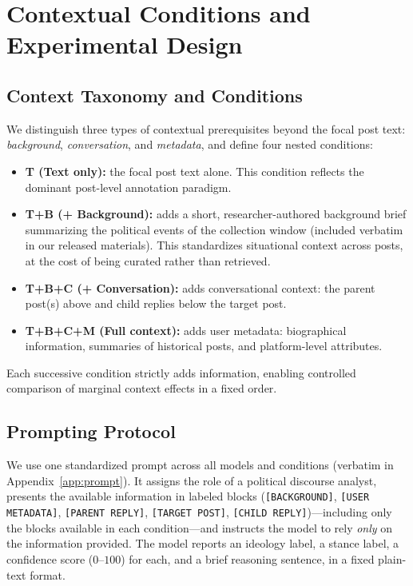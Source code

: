 \documentclass[11pt]{article}
\begin{document}
\section{Contextual Conditions and Experimental Design}
\label{sec:context_design}

\subsection{Context Taxonomy and Conditions}
\label{sec:context_conditions}

We distinguish three types of contextual prerequisites beyond the focal post text: \textit{background}, \textit{conversation}, and \textit{metadata}, and define four nested conditions:

\begin{itemize}
    \item \textbf{T (Text only):} the focal post text alone. This condition reflects the dominant post-level annotation paradigm.
    \item \textbf{T+B (+ Background):} adds a short, researcher-authored background brief summarizing the political events of the collection window (included verbatim in our released materials). This standardizes situational context across posts, at the cost of being curated rather than retrieved.
    \item \textbf{T+B+C (+ Conversation):} adds conversational context: the parent post(s) above and child replies below the target post.
    \item \textbf{T+B+C+M (Full context):} adds user metadata: biographical information, summaries of historical posts, and platform-level attributes.
\end{itemize}

Each successive condition strictly adds information, enabling controlled comparison of marginal context effects in a fixed order.

\subsection{Prompting Protocol}
\label{sec:prompting}
We use one standardized prompt across all models and conditions (verbatim in Appendix~\ref{app:prompt}). It assigns the role of a political discourse analyst, presents the available information in labeled blocks (\texttt{[BACKGROUND]}, \texttt{[USER METADATA]}, \texttt{[PARENT REPLY]}, \texttt{[TARGET POST]}, \texttt{[CHILD REPLY]})---including only the blocks available in each condition---and instructs the model to rely \emph{only} on the information provided. The model reports an ideology label, a stance label, a confidence score ($0$--$100$) for each, and a brief reasoning sentence, in a fixed plain-text format.
\end{document}
